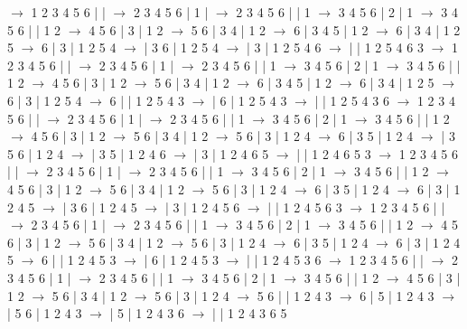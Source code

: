 \documentclass{article}
\begin{document}
\newline
 $\rightarrow$ 1 2 3 4 5 6 |  |  $\rightarrow$ 2 3 4 5 6 | 1 |  $\rightarrow$ 2 3 4 5 6 |  | 1 $\rightarrow$ 3 4 5 6 | 2 | 1 $\rightarrow$ 3 4 5 6 |  | 1 2 $\rightarrow$ 4 5 6 | 3 | 1 2 $\rightarrow$ 5 6 | 3 4 | 1 2 $\rightarrow$ 6 | 3 4 5 | 1 2 $\rightarrow$ 6 | 3 4 | 1 2 5 $\rightarrow$ 6 | 3 | 1 2 5 4 $\rightarrow$  | 3 6 | 1 2 5 4 $\rightarrow$  | 3 | 1 2 5 4 6 $\rightarrow$  |  | 1 2 5 4 6 3
\newline
 $\rightarrow$ 1 2 3 4 5 6 |  |  $\rightarrow$ 2 3 4 5 6 | 1 |  $\rightarrow$ 2 3 4 5 6 |  | 1 $\rightarrow$ 3 4 5 6 | 2 | 1 $\rightarrow$ 3 4 5 6 |  | 1 2 $\rightarrow$ 4 5 6 | 3 | 1 2 $\rightarrow$ 5 6 | 3 4 | 1 2 $\rightarrow$ 6 | 3 4 5 | 1 2 $\rightarrow$ 6 | 3 4 | 1 2 5 $\rightarrow$ 6 | 3 | 1 2 5 4 $\rightarrow$ 6 |  | 1 2 5 4 3 $\rightarrow$  | 6 | 1 2 5 4 3 $\rightarrow$  |  | 1 2 5 4 3 6
\newline
 $\rightarrow$ 1 2 3 4 5 6 |  |  $\rightarrow$ 2 3 4 5 6 | 1 |  $\rightarrow$ 2 3 4 5 6 |  | 1 $\rightarrow$ 3 4 5 6 | 2 | 1 $\rightarrow$ 3 4 5 6 |  | 1 2 $\rightarrow$ 4 5 6 | 3 | 1 2 $\rightarrow$ 5 6 | 3 4 | 1 2 $\rightarrow$ 5 6 | 3 | 1 2 4 $\rightarrow$ 6 | 3 5 | 1 2 4 $\rightarrow$  | 3 5 6 | 1 2 4 $\rightarrow$  | 3 5 | 1 2 4 6 $\rightarrow$  | 3 | 1 2 4 6 5 $\rightarrow$  |  | 1 2 4 6 5 3
\newline
 $\rightarrow$ 1 2 3 4 5 6 |  |  $\rightarrow$ 2 3 4 5 6 | 1 |  $\rightarrow$ 2 3 4 5 6 |  | 1 $\rightarrow$ 3 4 5 6 | 2 | 1 $\rightarrow$ 3 4 5 6 |  | 1 2 $\rightarrow$ 4 5 6 | 3 | 1 2 $\rightarrow$ 5 6 | 3 4 | 1 2 $\rightarrow$ 5 6 | 3 | 1 2 4 $\rightarrow$ 6 | 3 5 | 1 2 4 $\rightarrow$ 6 | 3 | 1 2 4 5 $\rightarrow$  | 3 6 | 1 2 4 5 $\rightarrow$  | 3 | 1 2 4 5 6 $\rightarrow$  |  | 1 2 4 5 6 3
\newline
 $\rightarrow$ 1 2 3 4 5 6 |  |  $\rightarrow$ 2 3 4 5 6 | 1 |  $\rightarrow$ 2 3 4 5 6 |  | 1 $\rightarrow$ 3 4 5 6 | 2 | 1 $\rightarrow$ 3 4 5 6 |  | 1 2 $\rightarrow$ 4 5 6 | 3 | 1 2 $\rightarrow$ 5 6 | 3 4 | 1 2 $\rightarrow$ 5 6 | 3 | 1 2 4 $\rightarrow$ 6 | 3 5 | 1 2 4 $\rightarrow$ 6 | 3 | 1 2 4 5 $\rightarrow$ 6 |  | 1 2 4 5 3 $\rightarrow$  | 6 | 1 2 4 5 3 $\rightarrow$  |  | 1 2 4 5 3 6
\newline
 $\rightarrow$ 1 2 3 4 5 6 |  |  $\rightarrow$ 2 3 4 5 6 | 1 |  $\rightarrow$ 2 3 4 5 6 |  | 1 $\rightarrow$ 3 4 5 6 | 2 | 1 $\rightarrow$ 3 4 5 6 |  | 1 2 $\rightarrow$ 4 5 6 | 3 | 1 2 $\rightarrow$ 5 6 | 3 4 | 1 2 $\rightarrow$ 5 6 | 3 | 1 2 4 $\rightarrow$ 5 6 |  | 1 2 4 3 $\rightarrow$ 6 | 5 | 1 2 4 3 $\rightarrow$  | 5 6 | 1 2 4 3 $\rightarrow$  | 5 | 1 2 4 3 6 $\rightarrow$  |  | 1 2 4 3 6 5
\end{document}
